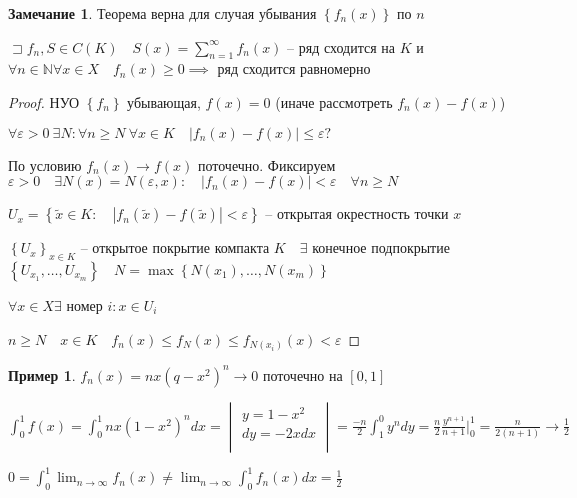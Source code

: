 \documentclass{book}
\newcommand\N{\ensuremath{\mathbb{N}}}
\newcommand{\tl}[1]{\widetilde{#1}}
\theoremstyle{definition}
\newtheorem*{note}{Замечание}
\newtheorem*{example}{Пример}
\begin{document}
    \begin{note}
        Теорема верна для случая убывания $\left\{ f_n(x) \right\} $ по $n$
    \end{note}
    \begin{theorem}

        $\sqsupset f_n, S\in C(K)\quad S(x) = \sum_{n=1}^{\infty } f_n(x)$ -- ряд сходится на $K$ и  $\forall n\in \N  \forall x\in X\quad f_n(x) \geqslant 0 \implies $ ряд сходится равномерно
    \end{theorem}

    \begin{proof}
        НУО $\left\{ f_n \right\} $ убывающая, $f\left(x \right)  = 0$ (иначе рассмотреть $f_n(x) - f(x)$)

        $\forall \varepsilon>0 ~\exists N: \forall n\geqslant N ~\forall x\in K\quad \left| f_n(x) - f(x) \right| \leqslant \varepsilon?$

        По условию $f_n(x) \to f\left(x \right) $ поточечно. Фиксируем $\varepsilon >0\quad \exists N(x) = N\left( \varepsilon, x \right) :\quad \left| f_n(x) - f(x) \right| <\varepsilon\quad \forall n \geqslant  N$

        $U_x = \left\{ \tl x\in K:\quad \left| f_n(\tl x) - f(\tl x) \right| <\varepsilon \right\} $ -- открытая окрестность точки $x$ 

        $\left\{ U_x \right\} _{x\in K}$ -- открытое покрытие компакта $K\quad \exists $ конечное подпокрытие $\left\{ U_{x_1}, \ldots, U_{x_m} \right\} \quad N = \max\left\{ N(x_1), \ldots, N\left( x_m \right)  \right\} $

        $\forall x\in X\exists $ номер $i:x\in U_i$

        $n\geqslant N\quad x\in K\quad f_n(x) \leqslant f_N(x) \leqslant f_{N(x_i)}(x)<\varepsilon$

    \end{proof}

    \begin{example}
        $f_n(x) = nx\left( q-x^2 \right) ^{n} \to 0$ поточечно на $[0,1]$

        $\int_{0}^1 f(x) = \int _0^1 nx\left( 1-x^2 \right) ^{n}dx = 
        \begin{vmatrix}
            y = 1-x^2\\
            dy = -2xdx\\
        \end{vmatrix} = \frac{-n}{2}\int^0_1 y^ndy = \frac{n}{2}\frac{y^{n+1}}{n+1}|_0^1 = \frac{n}{2(n+1)} \to \frac{1}{2}$

        $0= \int_0^1 \lim_{n \to \infty} f_n(x) \neq \lim_{n \to \infty} \int_0^1f_n(x)dx = \frac{1}{2}$
    \end{example}
\end{document}
